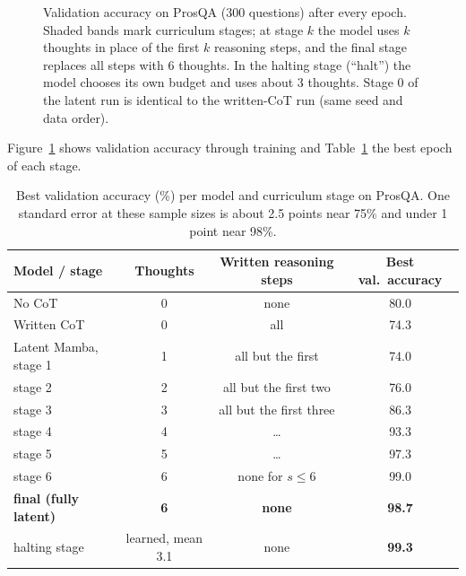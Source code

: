 \documentclass[10pt]{article}
\begin{document}
\begin{figure}[t]
\caption{Validation accuracy on ProsQA (300 questions) after every epoch. Shaded bands mark curriculum stages; at stage $k$ the model uses $k$ thoughts in place of the first $k$ reasoning steps, and the final stage replaces all steps with 6 thoughts. In the halting stage (``halt'') the model chooses its own budget and uses about 3 thoughts. Stage 0 of the latent run is identical to the written-CoT run (same seed and data order).}
\label{fig:curve}
\end{figure}

Figure~\ref{fig:curve} shows validation accuracy through training and Table~\ref{tab:stages} the best epoch of each stage.

\begin{table}[t]
\centering
\small
\begin{tabular}{@{}lccc@{}}
\toprule
Model / stage & Thoughts & Written reasoning steps & Best val.\ accuracy \\
\midrule
No CoT & 0 & none & 80.0 \\
Written CoT & 0 & all & 74.3 \\
\midrule
Latent Mamba, stage 1 & 1 & all but the first & 74.0 \\
\quad stage 2 & 2 & all but the first two & 76.0 \\
\quad stage 3 & 3 & all but the first three & 86.3 \\
\quad stage 4 & 4 & \dots & 93.3 \\
\quad stage 5 & 5 & \dots & 97.3 \\
\quad stage 6 & 6 & none for $s \le 6$ & 99.0 \\
\quad \textbf{final (fully latent)} & \textbf{6} & \textbf{none} & \textbf{98.7} \\
\quad halting stage & learned, mean 3.1 & none & \textbf{99.3} \\
\bottomrule
\end{tabular}
\caption{Best validation accuracy (\%) per model and curriculum stage on ProsQA. One standard error at these sample sizes is about 2.5 points near 75\% and under 1 point near 98\%.}
\label{tab:stages}
\end{table}
\end{document}
